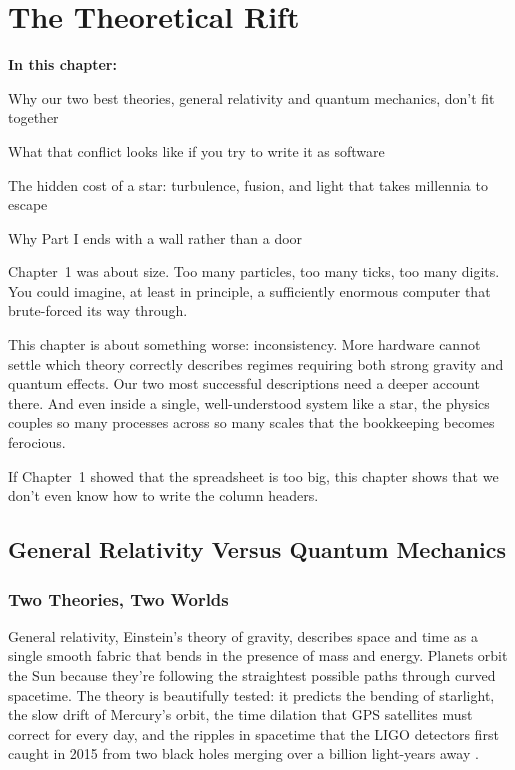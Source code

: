 \chapter{The Theoretical Rift}

\begin{chaptermapbox}
\textbf{In this chapter:}
\begin{compactchecklist}
\item Why our two best theories, general relativity and quantum mechanics, don't fit together
\item What that conflict looks like if you try to write it as software
\item The hidden cost of a star: turbulence, fusion, and light that takes millennia to escape
\item Why Part I ends with a wall rather than a door
\end{compactchecklist}
\end{chaptermapbox}

Chapter~1 was about size. Too many particles, too many ticks, too many digits. You could imagine, at least in principle, a sufficiently enormous computer that brute-forced its way through.

This chapter is about something worse: inconsistency. More hardware cannot settle which theory correctly describes regimes requiring both strong gravity and quantum effects. Our two most successful descriptions need a deeper account there. And even inside a single, well-understood system like a star, the physics couples so many processes across so many scales that the bookkeeping becomes ferocious.

If Chapter~1 showed that the spreadsheet is too big, this chapter shows that we don't even know how to write the column headers.

\section{General Relativity Versus Quantum Mechanics}

\subsection{Two Theories, Two Worlds}

General relativity, Einstein's theory of gravity, describes space and time as a single smooth fabric that bends in the presence of mass and energy. Planets orbit the Sun because they're following the straightest possible paths through curved spacetime. The theory is beautifully tested: it predicts the bending of starlight, the slow drift of Mercury's orbit, the time dilation that GPS satellites must correct for every day, and the ripples in spacetime that the LIGO detectors first caught in 2015 from two black holes merging over a billion light-years away \cite{abbott2016}.

